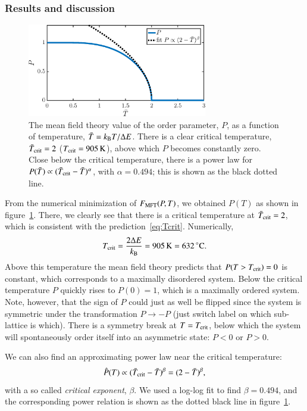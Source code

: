 \subsubsection*{Results and discussion}
\begin{figure}[!ht]
\begin{center}
  \includegraphics[width=0.7\textwidth]{../figures/P_MFT} 
  \caption{The mean field theory value of the order parameter, $P$, as
  a function of temperature, $\bar{T}=k_\mathrm{B} T/\Delta{E}$. There is a
  clear critical temperature, $\bar{T}_{\rm crit}=2$
  ($T_{\rm crit}=\unit[905]{K}$), above which $P$ becomes constantly
  zero. Close below the critical temperature, there is a power law for
  $P(\bar{T})\propto(\bar{T}_{\rm crit}-\bar{T})^{\alpha}$, with
  $\alpha=0.494$; this is shown as the black dotted line. }
  \label{fig:T1:P}
\end{center}
\end{figure}

From the numerical minimization of $F_{\text{MFT}}(P,T)$, we obtained $P(T)$
as shown in figure~\ref{fig:T1:P}. There, we clearly see that there is
a critical temperature at $\bar{T}_{\rm crit}=2$, which is consistent with the prediction~\eqref{eq:Tcrit}. Numerically,
\begin{equation}
T_{\rm crit}=\frac{2\Delta{E}}{\kB}
=\unit[905]{K}=\unit[632]{^{\circ}C}.
\end{equation}
Above this temperature the mean field theory predicts that
$P(T>T_{\rm crit})=0$ is constant, which corresponds to a maximally
disordered system. Below the critical temperature $P$ quickly rises to
$P(0)=1$, which is a maximally ordered system. Note, however, that the
sign of $P$ could just as well be flipped since the system is
symmetric under the transformation $P\to-P$ (just switch label on
which sub-lattice is which). There is a symmetry break at $T=T_{\rm
  crit}$, below which the system will spontaneously order itself into
an asymmetric state: $P<0$ or $P>0$.

We can also find an approximating power law near the critical
temperature:
\begin{equation}\label{eq:beta}
\hat{P}(T)\propto (\bar{T}_{\rm crit}-\bar{T})^{\beta}=(2-\bar{T})^{\beta},
\end{equation}
with a so called \emph{critical exponent}, $\beta$. We used a log-log
fit to find $\beta=0.494$, and the corresponding power relation is
shown as the dotted black line in figure~\ref{fig:T1:P}. 


